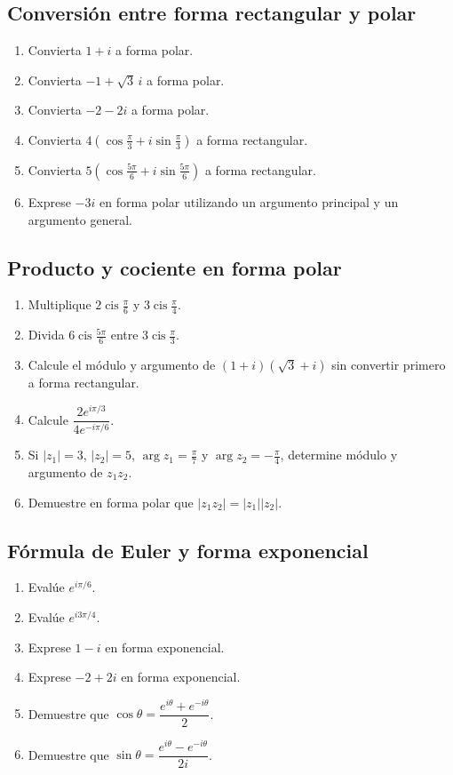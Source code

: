 \subsection{Conversión entre forma rectangular y polar}
\begin{enumerate}
\item Convierta $1+i$ a forma polar.
\item Convierta $-1+\sqrt3\,i$ a forma polar.
\item Convierta $-2-2i$ a forma polar.
\item Convierta $4\left(\cos\frac{\pi}{3}+i\sin\frac{\pi}{3}\right)$ a forma rectangular.
\item Convierta $5\left(\cos\frac{5\pi}{6}+i\sin\frac{5\pi}{6}\right)$ a forma rectangular.
\item Exprese $-3i$ en forma polar utilizando un argumento principal y un argumento general.
\end{enumerate}

\subsection{Producto y cociente en forma polar}
\begin{enumerate}
\item Multiplique $2\operatorname{cis}\frac{\pi}{6}$ y $3\operatorname{cis}\frac{\pi}{4}$.
\item Divida $6\operatorname{cis}\frac{5\pi}{6}$ entre $3\operatorname{cis}\frac{\pi}{3}$.
\item Calcule el módulo y argumento de $(1+i)(\sqrt3+i)$ sin convertir primero a forma rectangular.
\item Calcule $\dfrac{2e^{i\pi/3}}{4e^{-i\pi/6}}$.
\item Si $|z_1|=3$, $|z_2|=5$, $\arg z_1=\frac{\pi}{7}$ y $\arg z_2=-\frac{\pi}{4}$, determine módulo y argumento de $z_1z_2$.
\item Demuestre en forma polar que $|z_1z_2|=|z_1||z_2|$.
\end{enumerate}

\subsection{Fórmula de Euler y forma exponencial}
\begin{enumerate}
\item Evalúe $e^{i\pi/6}$.
\item Evalúe $e^{i3\pi/4}$.
\item Exprese $1-i$ en forma exponencial.
\item Exprese $-2+2i$ en forma exponencial.
\item Demuestre que $\cos\theta=\dfrac{e^{i\theta}+e^{-i\theta}}{2}$.
\item Demuestre que $\sin\theta=\dfrac{e^{i\theta}-e^{-i\theta}}{2i}$.
\end{enumerate}


